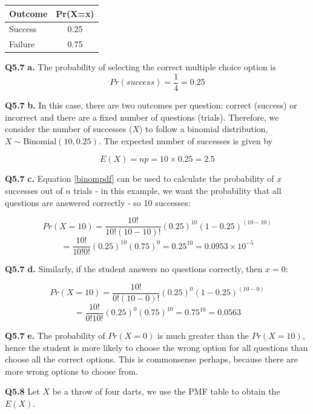 \documentclass[
  oneside]{krantz}
\begin{document}
\begin{center}
\begin{tabular}{l|c}
Outcome & Pr(X=x) \\
\hline
Success & 0.25 \\
Failure & 0.75 \\
\end{tabular}
\end{center}

\textbf{Q5.7} \textbf{a.} The probability of selecting the correct multiple choice option is
\[Pr(success)= \frac{1}{4} = 0.25\]

\textbf{Q5.7} \textbf{b.} In this case, there are two outcomes per question: correct (success) or incorrect and there are a fixed number of questions (trials). Therefore, we consider the number of successes (\(X\)) to follow a binomial distribution, \(X \sim \textrm{Binomial}(10, 0.25)\). The expected number of successes is given by

\[E(X) = np = 10 \times 0.25 = 2.5\]

\textbf{Q5.7} \textbf{c.} Equation \ref{binompdf} can be used to calculate the probability of \(x\) successes out of \(n\) trials - in this example, we want the probability that all questions are answered correctly - so 10 successes:

\[Pr(X=10) = \frac{10!}{10!(10-10)!}(0.25)^{10} (1-0.25)^{(10-10)}\]
\[ = \frac{10!}{10!0!}(0.25)^10 (0.75)^{0} = 0.25^{10} = 0.0953 \times 10^{-5}\]

\textbf{Q5.7} \textbf{d.} Similarly, if the student answers no questions correctly, then \(x=0\):

\[Pr(X=10) = \frac{10!}{0!(10-0)!}(0.25)^0 (1-0.25)^{(10-0)}\]
\[= \frac{10!}{0!10!}(0.25)^0 (0.75)^{10} = 0.75^{10} = 0.0563\]

\textbf{Q5.7} \textbf{e.} The probability of \(Pr(X=0)\) is much greater than the \(Pr(X=10)\), hence the student is more likely to choose the wrong option for all questions than choose all the correct options. This is commonsense perhaps, because there are more wrong options to choose from.

\textbf{Q5.8} Let \(X\) be a throw of four darts, we use the PMF table to obtain the \(E(X)\).
\end{document}
